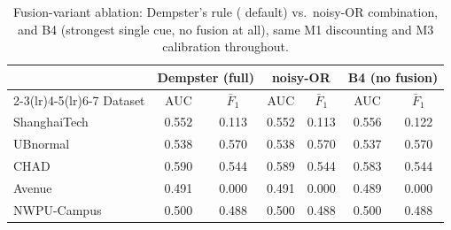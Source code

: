 \begin{table}[t]
\centering
\caption{Fusion-variant ablation: Dempster's rule (\method{} default) vs.\
noisy-OR combination, and B4 (strongest single cue, no fusion at all), same
M1 discounting and M3 calibration throughout.}
\label{tab:ablationfusion}
\setlength{\tabcolsep}{3.5pt}
\renewcommand{\arraystretch}{1.15}
\footnotesize
\begin{tabular}{@{}lcccccc@{}}
\toprule
 & \multicolumn{2}{c}{Dempster (full)} & \multicolumn{2}{c}{noisy-OR} & \multicolumn{2}{c}{B4 (no fusion)} \\
\cmidrule(lr){2-3}\cmidrule(lr){4-5}\cmidrule(lr){6-7}
Dataset & AUC & $\bar F_1$ & AUC & $\bar F_1$ & AUC & $\bar F_1$ \\
\midrule
ShanghaiTech & 0.552 & 0.113 & 0.552 & 0.113 & 0.556 & 0.122 \\
UBnormal     & 0.538 & 0.570 & 0.538 & 0.570 & 0.537 & 0.570 \\
CHAD         & 0.590 & 0.544 & 0.589 & 0.544 & 0.583 & 0.544 \\
Avenue       & 0.491 & 0.000 & 0.491 & 0.000 & 0.489 & 0.000 \\
NWPU-Campus  & 0.500 & 0.488 & 0.500 & 0.488 & 0.500 & 0.488 \\
\bottomrule
\end{tabular}
\end{table}
